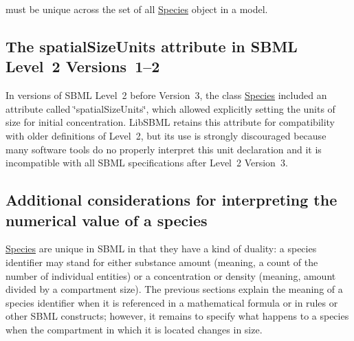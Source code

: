 must be unique across the set of all \hyperlink{class_species}{Species} object in a model.\hypertarget{class_species_species-other}{}\subsection{The spatial\+Size\+Units attribute in S\+B\+M\+L Level 2 Versions 1–2}\label{class_species_species-other}
In versions of S\+B\+ML Level~2 before Version~3, the class \hyperlink{class_species}{Species} included an attribute called \char`\"{}spatial\+Size\+Units\char`\"{}, which allowed explicitly setting the units of size for initial concentration. Lib\+S\+B\+ML retains this attribute for compatibility with older definitions of Level~2, but its use is strongly discouraged because many software tools do no properly interpret this unit declaration and it is incompatible with all S\+B\+ML specifications after Level~2 Version~3.\hypertarget{class_species_species-math}{}\subsection{Additional considerations for interpreting the numerical value of a species}\label{class_species_species-math}
\hyperlink{class_species}{Species} are unique in S\+B\+ML in that they have a kind of duality\+: a species identifier may stand for either substance amount (meaning, a count of the number of individual entities) or a concentration or density (meaning, amount divided by a compartment size). The previous sections explain the meaning of a species identifier when it is referenced in a mathematical formula or in rules or other S\+B\+ML constructs; however, it remains to specify what happens to a species when the compartment in which it is located changes in size.

